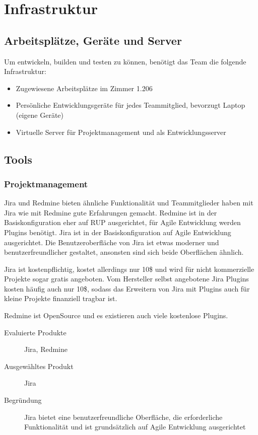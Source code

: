 \chapter{Infrastruktur}	

	\section{Arbeitsplätze, Geräte und Server}
		Um entwickeln, builden und testen zu können, benötigt das Team die folgende Infrastruktur:
		\begin{itemize}
			\setlength{\itemsep}{-\parsep}
			\item Zugewiesene Arbeitsplätze im Zimmer 1.206
			\item Persönliche Entwicklungsgeräte für jedes Teammitglied, bevorzugt Laptop (eigene Geräte)
			\item Virtuelle Server für Projektmanagement und als Entwicklungsserver
		\end{itemize}

		
	\section{Tools}
		\subsection{Projektmanagement}	
			Jira und Redmine bieten ähnliche Funktionalität und Teammitglieder haben mit Jira wie mit Redmine gute Erfahrungen gemacht. 
			Redmine ist in der Basiskonfiguration eher auf RUP ausgerichtet, für Agile Entwicklung werden Plugins benötigt. 
			Jira ist in der Basiskonfiguration auf Agile Entwicklung ausgerichtet. 
			Die Benutzeroberfläche von Jira ist etwas moderner und benutzerfreundlicher gestaltet, ansonsten sind sich beide Oberflächen ähnlich. 
			
			Jira ist kostenpflichtig, kostet allerdings nur 10\$ \cite{atlassan_jira_2014} und wird für nicht kommerzielle Projekte sogar gratis angeboten.
			Vom Hersteller selbst angebotene Jira Plugins kosten häufig auch nur 10\$, 
			sodass das Erweitern von Jira mit Plugins auch für kleine Projekte finanziell tragbar ist.
			
			Redmine ist OpenSource und es existieren auch viele kostenlose Plugins.
		
			\begin{description}
				\item[Evaluierte Produkte] Jira, Redmine
				\item[Ausgewähltes Produkt] Jira
				\item[Begründung] Jira bietet eine benutzerfreundliche Oberfläche, die erforderliche Funktionalität und ist grundsätzlich auf Agile Entwicklung ausgerichtet
			\end{description}


